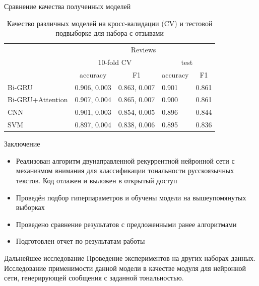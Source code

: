 \documentclass{beamer}
\begin{document}
\begin{frame}{Сравнение качества полученных моделей}
\begin{table}[]
	\centering
	\caption{Качество различных моделей на кросс-валидации (CV) и тестовой подвыборке для набора с отзывами}
	\label{tab:res2}
	\begin{tabular}{l|l|l|l|l|}
		\cline{2-5}
		& \multicolumn{4}{c|}{Reviews}                                                                                      \\ \cline{2-5} 
		& \multicolumn{2}{c|}{10-fold CV}                         & \multicolumn{2}{c|}{test}                               \\ \cline{2-5} 
		& \multicolumn{1}{c|}{accuracy} & \multicolumn{1}{c|}{F1} & \multicolumn{1}{c|}{accuracy} & \multicolumn{1}{c|}{F1} \\ \hline
		\multicolumn{1}{|l|}{Bi-GRU}           & 0.906, 0.003                  & 0.863, 0.007            & 0.901                         & 0.861                   \\ \hline
		\multicolumn{1}{|l|}{Bi-GRU+Attention} & 0.907, 0.004                  & 0.865, 0.007            & 0.900                         & 0.861                   \\ \hline
		\multicolumn{1}{|l|}{CNN}              & 0.901, 0.003                  & 0.854, 0.005            & 0.896                         & 0.844                   \\ \hline
		\multicolumn{1}{|l|}{SVM}              & 0.897, 0.004                  & 0.838, 0.006            & 0.895                         & 0.836                   \\ \hline
	\end{tabular}
\end{table}

\end{frame}
\begin{frame}{Заключение}

	\begin{itemize}
		\item Реализован алгоритм двунаправленной рекуррентной нейронной сети с механизмом внимания для классификации тональности русскоязычных текстов. Код отлажен и выложен в открытый доступ
		\item Проведён подбор гиперпараметров и обучены модели на вышеупомянутых выборках
		\item Проведено сравнение результатов с предложенными ранее алгоритмами
		\item Подготовлен отчет по результатам работы
	\end{itemize}

	\begin{block}{Дальнейшее исследование}
		Проведение экспериментов на других наборах данных.\\
		Исследование применимости данной модели в качестве модуля для нейронной сети, генерирующей сообщения с заданной тональностью.
	\end{block}
\end{frame}
\end{document}
